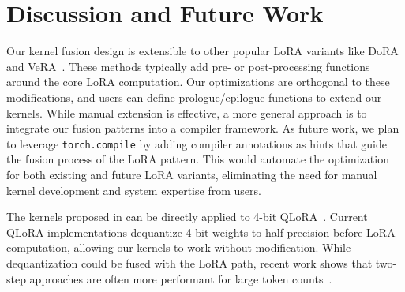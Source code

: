 \section{Discussion and Future Work}
\label{sec:discussion}

Our kernel fusion design is extensible to other popular LoRA variants like DoRA~\cite{liu2024dora} and VeRA~\cite{kopiczko2023vera}.
These methods typically add pre- or post-processing functions around the core LoRA computation.
Our optimizations are orthogonal to these modifications, and users can define prologue/epilogue functions to extend our kernels.
While manual extension is effective, a more general approach is to integrate our fusion patterns into a compiler framework.
As future work, we plan to leverage \texttt{torch.compile} by adding compiler annotations as hints that guide the fusion process of the LoRA pattern.
This would automate the optimization for both existing and future LoRA variants, eliminating the need for manual kernel development and system expertise from users.

The kernels proposed in \Name can be directly applied to 4-bit QLoRA~\cite{dettmers2023qlora}. 
Current QLoRA implementations dequantize 4-bit weights to half-precision before LoRA computation, allowing our kernels to work without modification.
While dequantization could be fused with the LoRA path, recent work shows that two-step approaches are often more performant for large token counts~\cite{ding2025tilus}.
